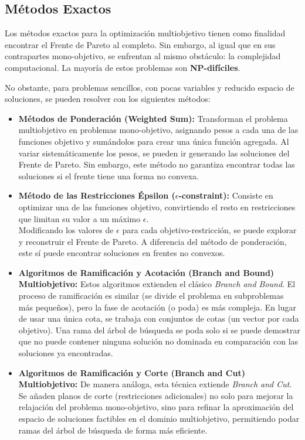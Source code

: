 \documentclass[12pt,a4paper]{book}
\begin{document}
\subsection{Métodos Exactos}

Los métodos exactos para la optimización multiobjetivo tienen como finalidad encontrar el Frente de Pareto al completo. Sin embargo, al igual que en sus contrapartes mono-objetivo, se enfrentan al mismo obstáculo: la complejidad computacional. La mayoría de estos problemas son \textbf{NP-difíciles}.

No obstante, para problemas sencillos, con pocas variables y reducido espacio de soluciones, se pueden resolver con los siguientes métodos:

\begin{itemize}
    \item \textbf{Métodos de Ponderación (Weighted Sum):} Transforman el problema multiobjetivo en problemas mono-objetivo, asignando pesos a cada una de las funciones objetivo y sumándolos para crear una única función agregada. Al variar sistemáticamente los pesos, se pueden ir generando las soluciones del Frente de Pareto. Sin embargo, este método no garantiza encontrar todas las soluciones si el frente tiene una forma no convexa.

    \item \textbf{Método de las Restricciones Épsilon ($\epsilon$-constraint):} Consiste en optimizar una de las funciones objetivo, convirtiendo el resto en restricciones que limitan su valor a un máximo $\epsilon$.\\
    Modificando los valores de $\epsilon$ para cada objetivo-restricción, se puede explorar y reconstruir el Frente de Pareto. A diferencia del método de ponderación, este sí puede encontrar soluciones en frentes no convexos.

    \item \textbf{Algoritmos de Ramificación y Acotación (Branch and Bound) Multiobjetivo:} Estos algoritmos extienden el clásico \textit{Branch and Bound}. El proceso de ramificación es similar (se divide el problema en subproblemas más pequeños), pero la fase de acotación (o poda) es más compleja. En lugar de usar una única cota, se trabaja con conjuntos de cotas (un vector por cada objetivo). Una rama del árbol de búsqueda se poda solo si se puede demostrar que no puede contener ninguna solución no dominada en comparación con las soluciones ya encontradas.

    \item \textbf{Algoritmos de Ramificación y Corte (Branch and Cut) Multiobjetivo:} De manera análoga, esta técnica extiende \textit{Branch and Cut}. Se añaden planos de corte (restricciones adicionales) no solo para mejorar la relajación del problema mono-objetivo, sino para refinar la aproximación del espacio de soluciones factibles en el dominio multiobjetivo, permitiendo podar ramas del árbol de búsqueda de forma más eficiente.
\end{itemize}
\end{document}
